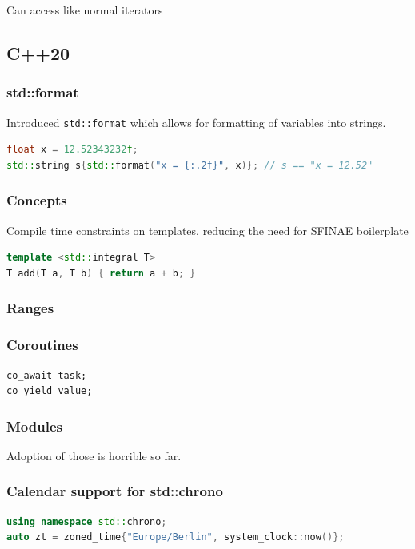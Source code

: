 \documentclass{article}
\begin{document}
Can access like normal iterators
\subsection{C++20}
\subsubsection{std::format}
Introduced \texttt{std::format} which allows for formatting of variables into strings.

\begin{lstlisting}[language=cpp,caption={std::format}]
float x = 12.52343232f;
std::string s{std::format("x = {:.2f}", x)}; // s == "x = 12.52"
\end{lstlisting}

\subsubsection{Concepts}
Compile time constraints on templates, reducing the need for SFINAE boilerplate
\begin{lstlisting}[language=cpp,caption={Concepts}]
template <std::integral T>
T add(T a, T b) { return a + b; }
\end{lstlisting}

\subsubsection{Ranges}
\subsubsection{Coroutines}
\begin{lstlisting}
co_await task;
co_yield value;
\end{lstlisting}

\subsubsection{Modules}
Adoption of those is horrible so far.

\subsubsection{Calendar support for std::chrono}
\begin{lstlisting}[language=cpp,caption={C++20: Calendar support for std::chrono}]
using namespace std::chrono;
auto zt = zoned_time{"Europe/Berlin", system_clock::now()};
\end{lstlisting}
\end{document}
